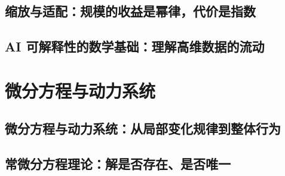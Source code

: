 \documentclass[UTF8,openany]{ctexbook}
\theoremstyle{definition}
\theoremstyle{plain}
\begin{document}
\chapter*{缩放与适配：规模的收益是幂律，代价是指数}
\label{ch:131}





\clearpage
\chapter*{AI 可解释性的数学基础：理解高维数据的流动}
\label{ch:132}





\clearpage
\part{微分方程与动力系统}
\chapter*{微分方程与动力系统：从局部变化规律到整体行为}
\label{ch:133}

\clearpage
\chapter*{常微分方程理论：解是否存在、是否唯一}
\label{ch:134}





\clearpage
\end{document}
